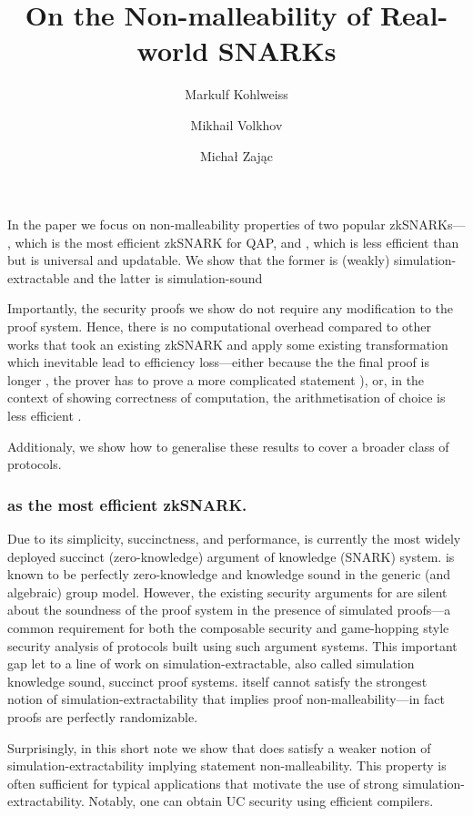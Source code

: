 \documentclass[runningheads,11pt]{llncs}
\title{On the Non-malleability of Real-world SNARKs}
\author{Markulf Kohlweiss\inst{1,2} \and Mikhail Volkhov\inst{1} \and Michał Zając\inst{3}}
\institute{University of Edinburgh, Edinburgh, UK \and IOHK \\ \email{mkohlwei@inf.ed.ac.uk}, \email{mikhail.volkhov@ed.ac.uk} \and Clearmatics, London UK \\ \email{m.p.zajac@gmail.com}}
\begin{document}
	\maketitle
	
	In the paper we focus on non-malleability properties of two popular zkSNARKs---\groth{}  \cite{EC:Groth16}, which is the most efficient zkSNARK for QAP, and \plonk{} \cite{EPRINT:GabWilCio19}, which is less efficient than \groth{} but is universal and updatable.
	We show that the former is (weakly) simulation-extractable and the latter is simulation-sound
	
	Importantly, the security proofs we show do not require any modification to the proof system. 
	Hence, there is no computational overhead compared to other works that took an existing zkSNARK and apply some existing transformation which inevitable lead to efficiency loss---either because the the final proof is longer \cite{EPRINT:BowGab18}, the prover has to prove a more complicated statement \cite{ASIACCS:DerSla18,EPRINT:AbdRamSla20}), or, in the context of showing correctness of computation, the arithmetisation of choice is less efficient \cite{C:GroMal17}.	
	
	Additionaly, we show how to generalise these results to cover a broader class of protocols.  
	
	\subsubsection*{\groth{} as the most efficient zkSNARK.}
	Due to its simplicity, succinctness, and performance, \groth{} is
  currently the most widely deployed succinct (zero-knowledge) argument of
  knowledge (SNARK) system. \groth{} is known to be perfectly zero-knowledge and knowledge sound in the generic (and algebraic) group model. However, the existing security arguments for \groth{} are silent about the soundness of the proof system in the presence of simulated proofs---a common requirement for both the composable security and game-hopping style security analysis of protocols built using such argument systems. This important gap let to a line of work on simulation-extractable, also called simulation knowledge sound, succinct proof systems. \groth{} itself cannot satisfy the strongest
  notion of simulation-extractability that implies proof
  non-malleability---in fact proofs are perfectly randomizable.

  Surprisingly, in this short note we show that \groth{} does satisfy a
  weaker notion of simulation-extractability implying statement
  non-malleability. This property is often sufficient for typical
  applications that motivate the use of strong
  simulation-extractability. Notably, one can obtain UC security using
  efficient compilers.
	
\end{document}
